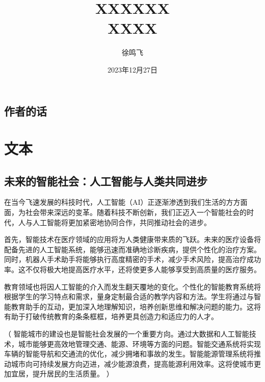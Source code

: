\documentclass[11pt, a4paper, oneside, fontset=none]{ctexbook}
\title{{\Huge{\textbf{XXXXXX}}}\\XXXX}
\author{徐鸣飞}
\date{2023年12月27日}
\newenvironment{ignore}{%
  \color{gray}%
  \ignorespaces%
  （%
}{%
  ）%
  \ignorespacesafterend%
}
\begin{document}
\maketitle

\newpage                    %
\setcounter{page}{1}        %
\section*{作者的话}

\newpage                    %
\setcounter{page}{1}        %
\tableofcontents            %

\newpage                    %
\setcounter{page}{1}        %

\chapter{文本}
\section{未来的智能社会：人工智能与人类共同进步}
在当今飞速发展的科技时代，人工智能（AI）正逐渐渗透到我们生活的方方面面，为社会带来深远的变革。随着科技不断创新，我们正迈入一个智能社会的时代，人与人工智能将更加紧密地协同合作，共同推动社会的进步。

首先，智能技术在医疗领域的应用将为人类健康带来质的飞跃。未来的医疗设备将配备先进的人工智能系统，能够迅速而准确地诊断疾病，提供个性化的治疗方案。同时，机器人手术助手将能够执行高度精密的手术，减少手术风险，提高治疗成功率。这不仅将极大地提高医疗水平，还将使更多人能够享受到高质量的医疗服务。

教育领域也将因人工智能的介入而发生翻天覆地的变化。个性化的智能教育系统将根据学生的学习特点和需求，量身定制最合适的教学内容和方法。学生将通过与智能教育助手的互动，更加深入地理解知识，培养创新思维和解决问题的能力。这将有助于打破传统教育的条条框框，培养更具创造力和适应力的人才。

\begin{ignore}智能城市的建设也是智能社会发展的一个重要方向。通过大数据和人工智能技术，城市能够更高效地管理交通、能源、环境等方面的问题。智能交通系统将实现车辆的智能导航和交通流的优化，减少拥堵和事故的发生。智能能源管理系统将推动城市向可持续发展方向迈进，减少能源浪费，提高能源利用效率。这将使城市更加宜居，提升居民的生活质量。
\end{ignore}
\end{document}
